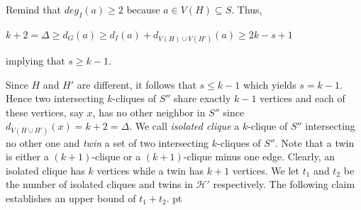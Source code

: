 \documentclass[11pt]{article}
\newcommand{\2}{ \vspace{0.2cm} }
\newcommand{\1}{ \vspace{0.1cm} }
\begin{document}
\noindent
Remind that $deg_{I}(a) \geq 2$ because $a \in V(H) \subseteq S$. Thus,

$k+2=\Delta \ge d_G(a) \ge d_I(a)+d_{V(H)\cup V(H')}(a) \ge 2k-s+1$

\noindent
implying that $s\ge k-1 $.


Since $H$ and $H'$ are different, it follows that $s \leq k - 1$ which yields $s = k - 1$.
Hence two intersecting $k$-cliques of $S''$ share exactly $k-1$ vertices and each of these vertices, say $x$, has no other neighbor in $S''$ since $d_{V(H \cup H')}(x)=k+2=\Delta$. We call \emph{isolated clique} a $k$-clique of $S''$ intersecting no other one and \emph{twin} a set of two intersecting $k$-cliques of $S''$.
Note that a twin is either a $(k+1)$-clique or a $(k+1)$-clique minus one edge.
Clearly, an isolated clique has $k$ vertices while a twin has $k + 1$ vertices.
We let $t_{1}$ and $t_{2}$ be the number of isolated cliques and twins in $\mathcal{H}'$ respectively. The following claim establishes an upper bound of $t_{1} + t_{2}$.
 pt
\end{document}
